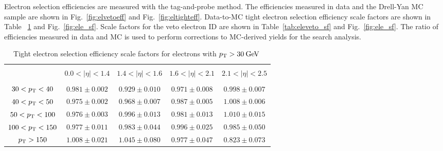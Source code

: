 Electron selection efficiencies are measured with the tag-and-probe method. The efficiencies measured in data and the Drell-Yan MC sample are shown in Fig.~\ref{fig:elvetoeff} and Fig.~\ref{fig:eltighteff}. Data-to-MC tight electron selection efficiency scale factors are shown in Table ~\ref{tab:eletight_sf} and Fig.~\ref{fig:ele_sf}. Scale factors for the veto electron ID are shown in Table~\ref{tab:eleveto_sf} and Fig.~\ref{fig:ele_sf}. The ratio of efficiencies measured in data and MC is used to perform corrections to MC-derived yields for the search analysis.


\begin{table}[!ht]
\centering
\begin{tabular}{|c|c|c|c|c|}
\hline
&                          &                              &                                         &       \\
  & $0.0 < |\eta| < 1.4$ & $1.4 < |\eta| < 1.6$ & $1.6 < |\eta| < 2.1$ & $2.1 < |\eta| < 2.5$ \\
  &                          &                              &                                         & \\
\hline	
$30 < p_\mathrm{T} <  40$ &  $0.981 \pm  0.002$  & $ 0.929 \pm  0.010$  &  $0.971 \pm  0.008$  &  $0.998 \pm  0.007$ \\
\hline
$40 < p_\mathrm{T} <  50$ & $ 0.975 \pm  0.002 $ &  $0.968 \pm  0.007$  &  $0.987 \pm  0.005$  &  $1.008 \pm  0.006$ \\
\hline 
$50 < p_\mathrm{T} < 100$ &  $0.976 \pm  0.003 $ &  $0.996 \pm  0.013$  &  $0.981 \pm  0.013$  &  $1.010 \pm  0.015$ \\
\hline
$100 < p_\mathrm{T} < 150$ &  $0.977 \pm  0.011$  &  $0.983 \pm  0.044$  &  $0.996 \pm  0.025$  &  $0.985 \pm  0.050$ \\
\hline    
      $p_\mathrm{T} > 150$ &  $1.008 \pm  0.021$  &  $1.045 \pm  0.080$  &  $0.977 \pm  0.047$  &  $0.823 \pm  0.073$ \\
\hline
\end{tabular}	
\caption{Tight electron selection efficiency scale factors for electrons with $p_\mathrm{T}>30\:\mathrm{Ge\kern -0.1em V}\:$}
\label{tab:eletight_sf}
\end{table}

